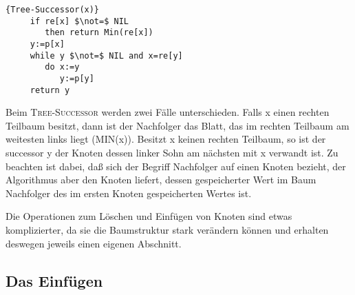 \documentclass[ngerman,draft,parskip=half*,twoside]{scrreprt}
\theoremstyle{break}
\begin{document}
   \begin{Algorithmus}[H]
    \begin{lstlisting}[frame=tlrb, mathescape=true, title=\textsc{Tree-Successor\textnormal{(x)}}, gobble=4]{Tree-Successor(x)}
     if re[x] $\not=$ NIL
        then return Min(re[x])
     y:=p[x]
     while y $\not=$ NIL and x=re[y]
        do x:=y
           y:=p[y]
     return y
    \end{lstlisting}

   Beim \textsc{Tree-Successor} werden zwei Fälle unterschieden. Falls x 
   einen rechten Teilbaum besitzt, dann ist der Nachfolger das Blatt, das im 
   rechten Teilbaum am weitesten links liegt (\textsc{MIN}(x)). Besitzt x keinen 
   rechten Teilbaum, so ist der successor y der Knoten dessen linker Sohn 
   am nächsten mit x verwandt ist. Zu beachten ist dabei, daß sich der Begriff Nachfolger auf einen Knoten bezieht, der Algorithmus
   aber den Knoten liefert, dessen gespeicherter Wert im Baum Nachfolger des im ersten Knoten gespeicherten Wertes ist. 
   \end{Algorithmus}
   
Die Operationen zum Löschen und Einfügen von Knoten sind etwas komplizierter, da sie die Baumstruktur stark verändern können und
erhalten deswegen jeweils einen eigenen Abschnitt.
\subsection{Das Einfügen}
\end{document}
